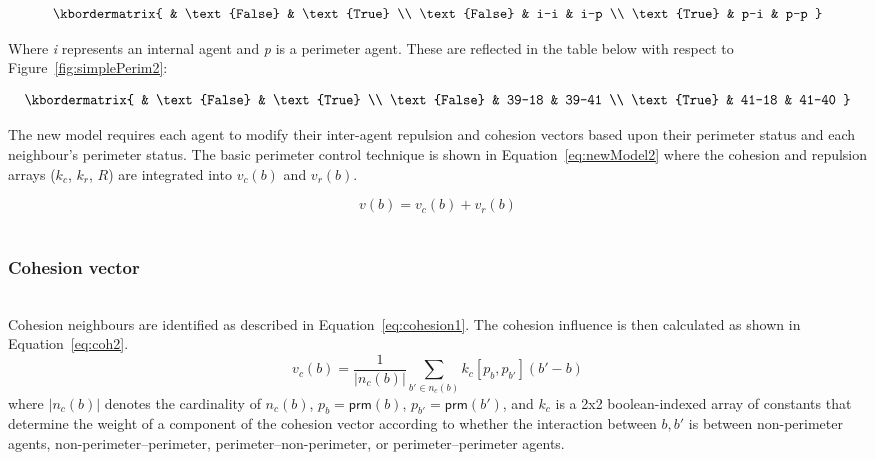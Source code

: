 \documentclass[12pt,a4paper]{IEEEtran}
\newcommand{\prm}{\mathsf{prm}}
\newcommand{\kc}{\mathit{k_c}}
\newcommand{\kr}{\mathit{k_r}}
\newcommand{\rb}{\mathit{R}}
\begin{document}
\[
  \kbordermatrix{
                   & \text{False} & \text{True} \\
    \text{False}   & i-i   & i-p  \\
    \text{True}    & p-i   & p-p
  }
\]

Where \emph{i} represents an internal agent and \emph{p} is a perimeter agent. These are reflected in the table below with respect to Figure~\ref{fig:simplePerim2}:

\[
  \kbordermatrix{
                   & \text{False} & \text{True}  \\
    \text{False}   & 39-18 & 39-41 \\
    \text{True}    & 41-18 & 41-40
  }
\]

The new model requires each agent to modify their inter-agent repulsion and cohesion vectors based upon their perimeter status and each neighbour's perimeter status. The basic perimeter control technique is shown in Equation~\ref{eq:newModel2} where the cohesion and repulsion arrays ($\kc$, $\kr$, $\rb$) are integrated into $v_c(b)$ and $v_r(b)$.

\begin{equation}\label{eq:newModel2}
v(b) = v_c(b) + v_r(b)
\end{equation}\\

\subsubsection{Cohesion vector}~\\
Cohesion neighbours are identified as described in Equation~\ref{eq:cohesion1}. The cohesion influence is then calculated as shown in Equation~\ref{eq:coh2}.
\begin{equation}\label{eq:coh2}
	v_c(b) = \frac{1}{|n_c(b)|} \sum_{b' \in n_c(b)} \kc[p_b, p_{b'}] (b' - b)
\end{equation}
where $|n_c(b)|$ denotes the cardinality of $n_c(b)$, $p_b = \prm(b)$, $p_{b'} 
= \prm(b')$, and 
$\kc$ is a 2x2 boolean-indexed array of constants that determine the weight
of a component of the cohesion vector according to
whether the interaction between $b,b'$ is between non-perimeter agents,
non-perimeter--perimeter, perimeter--non-perimeter, or perimeter--perimeter
agents.\\
\end{document}
